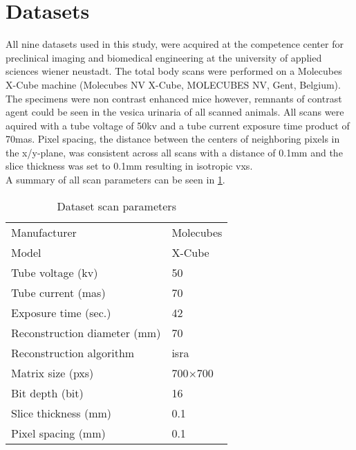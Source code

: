 \section{Datasets}\label{s:datasets}
All nine datasets used in this study, were acquired at the competence center for preclinical imaging and biomedical engineering at the university of applied sciences wiener neustadt.
The total body scans were performed on a Molecubes X-Cube \mct\space machine (Molecubes NV X-Cube, MOLECUBES NV, Gent, Belgium).
The specimens were non contrast enhanced mice however, remnants of contrast agent could be seen in the vesica urinaria of all scanned animals.
All scans were aquired with a tube voltage of 50\acrshort{kv} and a tube current exposure time product of 70\acrshort{mas}.
Pixel spacing, the distance between the centers of neighboring pixels in the x/y-plane, was consistent across all scans with a distance of 0.1mm and the slice thickness was set to 0.1mm resulting in isotropic \glspl{vx}.\\
A summary of all scan parameters can be seen in \cref{tab:scan-parameters}.\\
\begin{table}
	\begin{center}
		\begin{tabular}{l l}
			Manufacturer                  & Molecubes  \\
			Model                         & X-Cube     \\
			Tube voltage (\acrshort{kv})  & 50         \\
			Tube current (\acrshort{mas}) & 70         \\
			Exposure time (sec.)          & 42         \\
			Reconstruction diameter (mm)  & 70         \\
			Reconstruction algorithm      & \gls{isra} \\
			Matrix size (\glspl{px})      & 700$\times$700    \\
			Bit depth (\gls{bit})         & 16         \\
			Slice thickness (mm)          & 0.1        \\
			Pixel spacing (mm)            & 0.1        \\
		\end{tabular}
		\caption{Dataset scan parameters}\label{tab:scan-parameters}
	\end{center}
\end{table}

